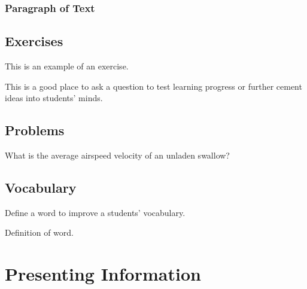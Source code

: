 \documentclass[11pt,fleqn]{book} %
\begin{document}
\subsection{Paragraph of Text}

\begin{example}
\lipsum[2]
\end{example}


\section{Exercises}

This is an example of an exercise.

\begin{exercise}
This is a good place to ask a question to test learning progress or further cement ideas into students' minds.
\end{exercise}


\section{Problems}

\begin{problem}
What is the average airspeed velocity of an unladen swallow?
\end{problem}


\section{Vocabulary}

Define a word to improve a students' vocabulary.

\begin{vocabulary}[Word]
Definition of word.
\end{vocabulary}



\chapter{Presenting Information}
\end{document}
